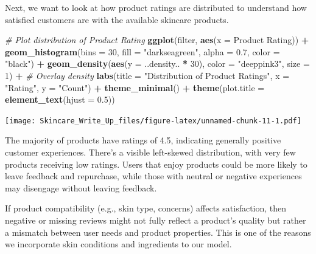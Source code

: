 \documentclass[
]{article}
\newenvironment{Shaded}{\begin{snugshade}}{\end{snugshade}}
\newcommand{\AttributeTok}[1]{\textcolor[rgb]{0.13,0.29,0.53}{#1}}
\newcommand{\CommentTok}[1]{\textcolor[rgb]{0.56,0.35,0.01}{\textit{#1}}}
\newcommand{\DecValTok}[1]{\textcolor[rgb]{0.00,0.00,0.81}{#1}}
\newcommand{\FloatTok}[1]{\textcolor[rgb]{0.00,0.00,0.81}{#1}}
\newcommand{\FunctionTok}[1]{\textcolor[rgb]{0.13,0.29,0.53}{\textbf{#1}}}
\newcommand{\NormalTok}[1]{#1}
\newcommand{\SpecialCharTok}[1]{\textcolor[rgb]{0.81,0.36,0.00}{\textbf{#1}}}
\newcommand{\StringTok}[1]{\textcolor[rgb]{0.31,0.60,0.02}{#1}}
\begin{document}
Next, we want to look at how product ratings are distributed to
understand how satisfied customers are with the available skincare
products.

\begin{Shaded}
\begin{Highlighting}[]
\CommentTok{\# Plot distribution of Product Rating}
\FunctionTok{ggplot}\NormalTok{(filter, }\FunctionTok{aes}\NormalTok{(}\AttributeTok{x =} \StringTok{\textasciigrave{}}\AttributeTok{Product Rating}\StringTok{\textasciigrave{}}\NormalTok{)) }\SpecialCharTok{+}
  \FunctionTok{geom\_histogram}\NormalTok{(}\AttributeTok{bins =} \DecValTok{30}\NormalTok{, }\AttributeTok{fill =} \StringTok{"darkseagreen"}\NormalTok{, }\AttributeTok{alpha =} \FloatTok{0.7}\NormalTok{, }\AttributeTok{color =} \StringTok{"black"}\NormalTok{) }\SpecialCharTok{+}
  \FunctionTok{geom\_density}\NormalTok{(}\FunctionTok{aes}\NormalTok{(}\AttributeTok{y =}\NormalTok{ ..density.. }\SpecialCharTok{*} \DecValTok{30}\NormalTok{), }\AttributeTok{color =} \StringTok{"deeppink3"}\NormalTok{, }\AttributeTok{size =} \DecValTok{1}\NormalTok{) }\SpecialCharTok{+}  \CommentTok{\# Overlay density}
  \FunctionTok{labs}\NormalTok{(}\AttributeTok{title =} \StringTok{"Distribution of Product Ratings"}\NormalTok{, }\AttributeTok{x =} \StringTok{"Rating"}\NormalTok{, }\AttributeTok{y =} \StringTok{"Count"}\NormalTok{) }\SpecialCharTok{+}
  \FunctionTok{theme\_minimal}\NormalTok{() }\SpecialCharTok{+}
  \FunctionTok{theme}\NormalTok{(}\AttributeTok{plot.title =} \FunctionTok{element\_text}\NormalTok{(}\AttributeTok{hjust =} \FloatTok{0.5}\NormalTok{))}
\end{Highlighting}
\end{Shaded}

\texttt{[image: Skincare\_Write\_Up\_files/figure-latex/unnamed-chunk-11-1.pdf]}

The majority of products have ratings of 4.5, indicating generally
positive customer experiences. There's a visible left-skewed
distribution, with very few products receiving low ratings. Users that
enjoy products could be more likely to leave feedback and repurchase,
while those with neutral or negative experiences may disengage without
leaving feedback.

If product compatibility (e.g., skin type, concerns) affects
satisfaction, then negative or missing reviews might not fully reflect a
product's quality but rather a mismatch between user needs and product
properties. This is one of the reasons we incorporate skin conditions
and ingredients to our model.
\end{document}
